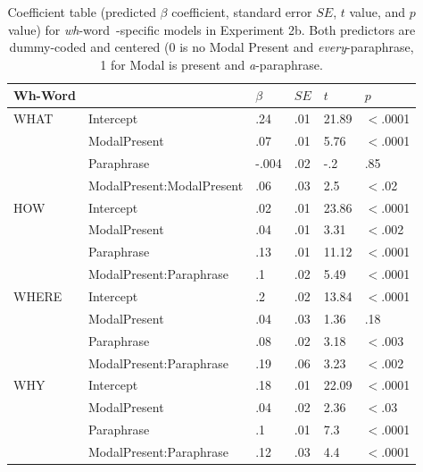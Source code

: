 \documentclass[12pt,letterpaper,table,svgnames,dvipsnames]{article}
\newcommand{\whw}{\emph{wh}-word~}
\begin{document}
\begin{table}
\begin{center} 
\caption{Coefficient table (predicted $\beta$ coefficient, standard error $SE$, $t$ value, and $p$ value) for \whw-specific models in Experiment 2b. Both predictors are dummy-coded and centered (0 is no Modal Present and \emph{every}-paraphrase, 1 for Modal is present and \emph{a}-paraphrase.} 
\label{sub-model_res_ex2b} 
\begin{tabular}{llllll} 
\toprule
Wh-Word & {} & $\beta$ & $SE$ & $t$ & $p$\\
\midrule
WHAT & Intercept & .24 & .01 & 21.89 & $<$.0001\\
{} & ModalPresent & .07 & .01 & 5.76 & $<$.0001\\
{} & Paraphrase & -.004 & .02 & -.2 & .85\\
{} & ModalPresent:ModalPresent & .06 & .03 & 2.5 & $<$.02\\
\midrule
HOW & Intercept & .02 & .01 & 23.86 & $<$.0001\\
{} & ModalPresent & .04 & .01 & 3.31 & $<$.002\\
{} & Paraphrase & .13 & .01 & 11.12 & $<$.0001\\
{} & ModalPresent:Paraphrase & .1 & .02 & 5.49 & $<$.0001\\
\midrule
WHERE & Intercept & .2 & .02 & 13.84 & $<$.0001\\
{} & ModalPresent & .04 & .03 & 1.36 & .18\\
{} & Paraphrase & .08 & .02 & 3.18 & $<$.003\\
{} & ModalPresent:Paraphrase & .19 & .06 & 3.23 & $<$.002\\
\midrule
WHY & Intercept & .18 & .01 & 22.09 & $<$.0001\\
{} & ModalPresent & .04 & .02 & 2.36 & $<$.03\\
{} & Paraphrase & .1 & .01 & 7.3 & $<$.0001\\
{} & ModalPresent:Paraphrase & .12 & .03 & 4.4 & $<$.0001\\

\end{tabular}
\end{center}
\end{table}
\end{document}
